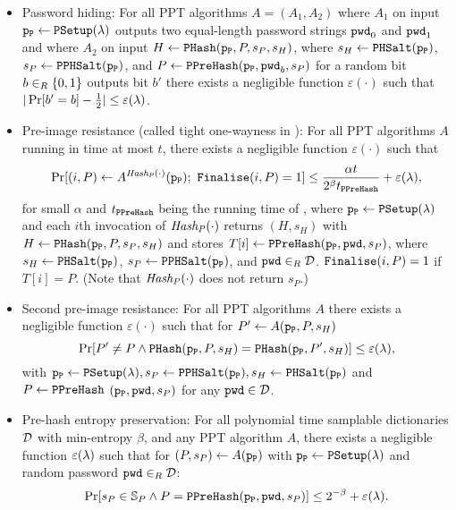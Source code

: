 \begin{itemize}
\item Password hiding: For all PPT algorithms $A=(A_1,A_2)$ where $A_1$ on input $\mathtt{p_P}\gets\mathtt{PSetup}(\lambda)$ outputs two equal-length password strings $\mathtt{pwd}_0$ and $\mathtt{pwd}_1$  and where $A_2$ on input $H\gets\mathtt{PHash}(\mathtt{p_P},P,s_P,s_H)$, where $s_H\gets\mathtt{PHSalt}(\mathtt{p_P})$, $s_P\gets\mathtt{PPHSalt}(\mathtt{p_P})$, and $P\gets\mathtt{PPreHash}(\mathtt{p_P},\mathtt{pwd}_b, s_P)$ for a random bit $b\in_R\{0,1\}$ outputs bit $b'$ there exists a negligible function $\varepsilon(\cdot)$ such that
$|\Pr[b'=b]-\frac12|\leq\varepsilon(\lambda)$.

\item Pre-image resistance (called tight one-wayness in \cite{BenhamoudaP13}): For all PPT algorithms $A$ running in time at most $t$, there exists a negligible function $\varepsilon(\cdot)$ such that
\[\Pr[(i,P)\gets A^{\mathit{Hash_P}(\cdot)}(\mathtt{p_P});~ \mathtt{Finalise}(i,P) = 1]\leq \frac{\alpha t}{2^\beta t_\mathtt{PPreHash}}+\varepsilon(\lambda),\]
for small $\alpha$ and $t_\mathtt{PPreHash}$ being the running time of \PPreHash, where $\mathtt{p_P}\gets\mathtt{PSetup}(\lambda)$ and each $i$th invocation of $\mathit{Hash_P}(\cdot)$ returns $(H,s_H)$ with $H\gets\mathtt{PHash}(\mathtt{p_P},P,s_P,s_H)$ and stores $T[i]\gets\mathtt{PPreHash}(\mathtt{p_P},\mathtt{pwd}, s_P)$, where $s_H\gets\mathtt{PHSalt}(\mathtt{p_P})$, $s_P\gets\mathtt{PPHSalt}(\mathtt{p_P})$, and $\mathtt{pwd}\in_R\mathcal{D}$.
$\mathtt{Finalise}(i,P) = 1$ if $T[i]=P$. (Note that $\mathit{Hash_P}(\cdot)$ does not return $s_P$.)

\item Second pre-image resistance: For all PPT algorithms $A$ there exists a negligible function $\varepsilon(\cdot)$ such that for $P'\gets A(\mathtt{p_P}, P, s_H)$
\[\Pr[P'\not=P \wedge \mathtt{PHash}(\mathtt{p_P},P,s_H)=\mathtt{PHash}(\mathtt{p_P},P',s_H)] \leq \varepsilon(\lambda),\]
with $\mathtt{p_P}\gets\mathtt{PSetup}(\lambda), s_P\gets\mathtt{PPHSalt}(\mathtt{p_P}), s_H\gets\mathtt{PHSalt}(\mathtt{p_P})$ and $P\gets\mathtt{PPreHash}$ $(\mathtt{p_P}, \mathtt{pwd}, s_P)$ for any $\mathtt{pwd}\in\mathcal{D}$.

\item Pre-hash entropy preservation: For all polynomial time samplable dictionaries $\mathcal{D}$ with min-entropy $\beta$, and any PPT algorithm $A$, there exists a negligible function $\varepsilon(\lambda)$ such that for $(P,s_P)\gets A(\mathtt{p_P})$ with $\mathtt{p_P}\gets\mathtt{PSetup}(\lambda)$ and random password $\mathtt{pwd}\in_R\mathcal{D}$:
\[\Pr[s_P\in\mathbb{S}_P \wedge P=\mathtt{PPreHash}(\mathtt{p_P},\mathtt{pwd},s_P)] \leq 2^{-\beta} + \varepsilon(\lambda).\]


\end{itemize}
